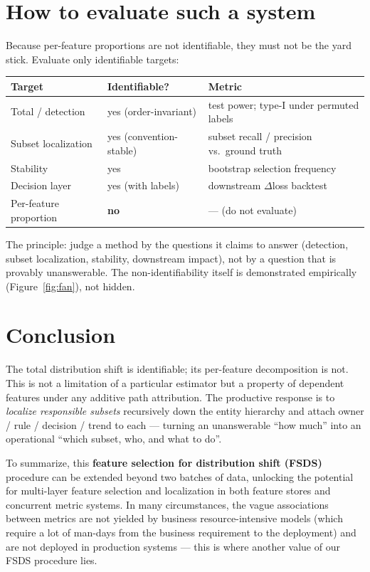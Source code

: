 \documentclass[11pt]{article}
\begin{document}
\section{How to evaluate such a system}

Because per-feature proportions are not identifiable, they must not be the yard
stick. Evaluate only identifiable targets:

\begin{center}
\begin{tabular}{lll}
\toprule
Target & Identifiable? & Metric \\
\midrule
Total / detection & yes (order-invariant) & test power; type-I under permuted labels \\
Subset localization & yes (convention-stable) & subset recall / precision vs.\ ground truth \\
Stability & yes & bootstrap selection frequency \\
Decision layer & yes (with labels) & downstream $\Delta$loss backtest \\
Per-feature proportion & \textbf{no} & --- (do not evaluate) \\
\bottomrule
\end{tabular}
\end{center}

The principle: judge a method by the questions it claims to answer (detection,
subset localization, stability, downstream impact), not by a question that is
provably unanswerable. The non-identifiability itself is demonstrated
empirically (Figure~\ref{fig:fan}), not hidden.

\section{Conclusion}

The total distribution shift is identifiable; its per-feature decomposition is
not. This is not a limitation of a particular estimator but a property of
dependent features under any additive path attribution. The productive response
is to \emph{localize responsible subsets} recursively down the entity hierarchy
and attach owner / rule / decision / trend to each --- turning an unanswerable
``how much'' into an operational ``which subset, who, and what to do''.

To summarize, this \textbf{feature selection for distribution shift (FSDS)}
procedure can be extended beyond two batches of data, unlocking the potential for
multi-layer feature selection and localization in both feature stores and
concurrent metric systems. In many circumstances, the vague associations between
metrics are not yielded by business resource-intensive models (which require a
lot of man-days from the business requirement to the deployment) and are not
deployed in production systems --- this is where another value of our FSDS
procedure lies.
\end{document}

